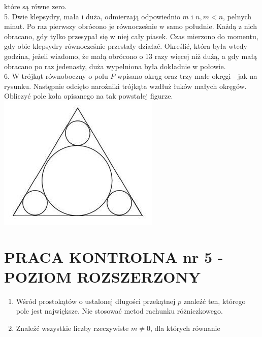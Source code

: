 \documentclass[10pt]{article}
\begin{document}
które są równe zero.\\
5. Dwie klepsydry, mała i duża, odmierzają odpowiednio $m$ i $n, m<n$, pełnych minut. Po raz pierwszy obrócono je równocześnie w samo południe. Każdą z nich obracano, gdy tylko przesypał się w niej cały piasek. Czas mierzono do momentu, gdy obie klepsydry równocześnie przestały działać. Określić, która była wtedy godzina, jeżeli wiadomo, że małą obrócono o 13 razy więcej niż dużą, a gdy małą obracano po raz jedenasty, duża wypełniona była dokładnie w połowie.\\
6. W trójkąt równoboczny o polu $P$ wpisano okrąg oraz trzy małe okręgi - jak na rysunku. Następnie odcięto narożniki trójkąta wzdłuż łuków małych okręgów. Obliczyć pole koła opisanego na tak powstałej figurze.\\
\includegraphics[max width=\textwidth, center]{2024_11_16_bc357fe772e8ec63b06ag-09}

\section*{PRACA KONTROLNA nr 5 - POZIOM ROZSZERZONY}
\begin{enumerate}
  \item Wśród prostokątów o ustalonej długości przekątnej $p$ znaleźć ten, którego pole jest największe. Nie stosować metod rachunku różniczkowego.
  \item Znaleźć wszystkie liczby rzeczywiste $m \neq 0$, dla których równanie
\end{enumerate}
\end{document}
